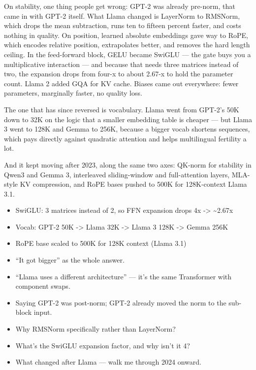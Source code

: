 \documentclass[10pt,twoside]{book}
\newcommand{\lab}[1]{\par\vspace{5pt}\noindent{\sffamily\footnotesize\bfseries\color{accent}#1}\par\vspace{1pt}}
\newcommand{\flab}[1]{\par\vspace{5pt}\noindent{\sffamily\footnotesize\bfseries\color{flag}#1}\par\vspace{1pt}}
\begin{document}
On stability, one thing people get wrong: GPT-2 was already pre-norm, that came in with GPT-2 itself. What Llama changed is LayerNorm to RMSNorm, which drops the mean subtraction, runs ten to fifteen percent faster, and costs nothing in quality. On position, learned absolute embeddings gave way to RoPE, which encodes relative position, extrapolates better, and removes the hard length ceiling. In the feed-forward block, GELU became SwiGLU --- the gate buys you a multiplicative interaction --- and because that needs three matrices instead of two, the expansion drops from four-x to about 2.67-x to hold the parameter count. Llama 2 added GQA for KV cache. Biases came out everywhere: fewer parameters, marginally faster, no quality loss.\par\vspace{3pt}
The one that has since reversed is vocabulary. Llama went from GPT-2's 50K down to 32K on the logic that a smaller embedding table is cheaper --- but Llama 3 went to 128K and Gemma to 256K, because a bigger vocab shortens sequences, which pays directly against quadratic attention and helps multilingual fertility a lot.\par\vspace{3pt}
And it kept moving after 2023, along the same two axes: QK-norm for stability in Qwen3 and Gemma 3, interleaved sliding-window and full-attention layers, MLA-style KV compression, and RoPE bases pushed to 500K for 128K-context Llama 3.1.\par\vspace{3pt}
\lab{Numbers}
\begin{itemize}
\item SwiGLU: 3 matrices instead of 2, so FFN expansion drops 4x -> \textasciitilde{}2.67x
\item Vocab: GPT-2 50K -> Llama 32K -> Llama 3 128K -> Gemma 256K
\item RoPE base scaled to 500K for 128K context (Llama 3.1)
\end{itemize}
\flab{Loses the signal}
\begin{itemize}
\item ``It got bigger'' as the whole answer.
\item ``Llama uses a different architecture'' --- it's the same Transformer with component swaps.
\item Saying GPT-2 was post-norm; GPT-2 already moved the norm to the sub-block input.
\end{itemize}
\lab{Then they ask}
\begin{itemize}
\item Why RMSNorm specifically rather than LayerNorm?
\item What's the SwiGLU expansion factor, and why isn't it 4?
\item What changed after Llama --- walk me through 2024 onward.
\end{itemize}
\end{document}
